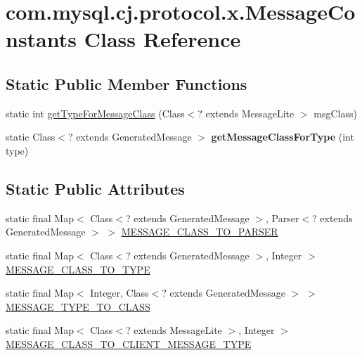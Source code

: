 \hypertarget{classcom_1_1mysql_1_1cj_1_1protocol_1_1x_1_1_message_constants}{}\section{com.\+mysql.\+cj.\+protocol.\+x.\+Message\+Constants Class Reference}
\label{classcom_1_1mysql_1_1cj_1_1protocol_1_1x_1_1_message_constants}
\subsection*{Static Public Member Functions}
\begin{DoxyCompactItemize}
\item 
static int \mbox{\hyperlink{classcom_1_1mysql_1_1cj_1_1protocol_1_1x_1_1_message_constants_a669e4c77f9271db3a03dfdbabe9f8687}{get\+Type\+For\+Message\+Class}} (Class$<$? extends Message\+Lite $>$ msg\+Class)
\item 
\mbox{\label{classcom_1_1mysql_1_1cj_1_1protocol_1_1x_1_1_message_constants_a8fa1b651d83c91c9b422c2713cb64cb5}} 
static Class$<$? extends Generated\+Message $>$ {\bfseries get\+Message\+Class\+For\+Type} (int type)
\end{DoxyCompactItemize}
\subsection*{Static Public Attributes}
\begin{DoxyCompactItemize}
\item 
static final Map$<$ Class$<$? extends Generated\+Message $>$, Parser$<$? extends Generated\+Message $>$ $>$ \mbox{\hyperlink{classcom_1_1mysql_1_1cj_1_1protocol_1_1x_1_1_message_constants_a672753dee2c3aca2ebfa6674e9a1d817}{M\+E\+S\+S\+A\+G\+E\+\_\+\+C\+L\+A\+S\+S\+\_\+\+T\+O\+\_\+\+P\+A\+R\+S\+ER}}
\item 
static final Map$<$ Class$<$? extends Generated\+Message $>$, Integer $>$ \mbox{\hyperlink{classcom_1_1mysql_1_1cj_1_1protocol_1_1x_1_1_message_constants_a6e1a08970c307a0216218b785569059c}{M\+E\+S\+S\+A\+G\+E\+\_\+\+C\+L\+A\+S\+S\+\_\+\+T\+O\+\_\+\+T\+Y\+PE}}
\item 
static final Map$<$ Integer, Class$<$? extends Generated\+Message $>$ $>$ \mbox{\hyperlink{classcom_1_1mysql_1_1cj_1_1protocol_1_1x_1_1_message_constants_afcd94ad22ee22dcac79ee95c4473db49}{M\+E\+S\+S\+A\+G\+E\+\_\+\+T\+Y\+P\+E\+\_\+\+T\+O\+\_\+\+C\+L\+A\+SS}}
\item 
static final Map$<$ Class$<$? extends Message\+Lite $>$, Integer $>$ \mbox{\hyperlink{classcom_1_1mysql_1_1cj_1_1protocol_1_1x_1_1_message_constants_ae1faf0f44c737fc14dbc49b51b82bcea}{M\+E\+S\+S\+A\+G\+E\+\_\+\+C\+L\+A\+S\+S\+\_\+\+T\+O\+\_\+\+C\+L\+I\+E\+N\+T\+\_\+\+M\+E\+S\+S\+A\+G\+E\+\_\+\+T\+Y\+PE}}
\end{DoxyCompactItemize}



